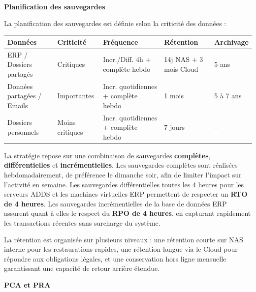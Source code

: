 \vspace{0.5cm}

\noindent \textbf{Planification des sauvegardes}

\noindent La planification des sauvegardes est définie selon la criticité des données :

\vspace{0.5cm}

\begin{center}
\small
    \begin{tabular}{|p{2.2cm}|p{2cm}|p{4.5cm}|p{2.5cm}|p{1.8cm}|}
        \hline
        \textbf{Données} & \textbf{Criticité} & \textbf{Fréquence} & \textbf{Rétention} & \textbf{Archivage} \\
        \hline
        ERP / Dossiers partagés & Critiques & Incr./Diff. 4h + complète hebdo & 14j NAS + 3 mois Cloud & 5 ans \\
        Données partagées / Emails & Importantes & Incr. quotidiennes + complète hebdo & 1 mois & 5 à 7 ans \\
        Dossiers personnels & Moins critiques & Incr. quotidiennes + complète hebdo & 7 jours & -- \\
        \hline
    \end{tabular}
\end{center}

\vspace{0.5cm}

\noindent La stratégie repose sur une combinaison de sauvegardes \textbf{complètes}, \textbf{différentielles} et \textbf{incrémentielles}. Les sauvegardes complètes sont réalisées hebdomadairement, de préférence le dimanche soir, afin de limiter l’impact sur l’activité en semaine.
Les sauvegardes différentielles toutes les 4 heures pour les serveurs ADDS et les machines virtuelles ERP permettent de respecter un \textbf{RTO de 4 heures}. Les sauvegardes incrémentielles de la base de données ERP assurent quant à elles le respect du \textbf{RPO de 4 heures}, en capturant rapidement les transactions récentes sans surcharge du système.

\noindent La rétention est organisée sur plusieurs niveaux : une rétention courte sur NAS interne pour les restaurations rapides, une rétention longue via le Cloud pour répondre aux obligations légales, et une conservation hors ligne mensuelle garantissant une capacité de retour arrière étendue.

\vspace{0.5cm}

\noindent \textbf{PCA et PRA}

